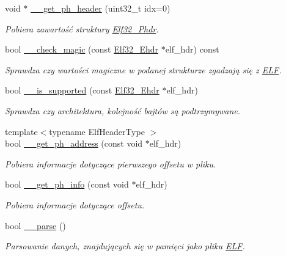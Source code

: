 \begin{DoxyCompactItemize}
void $\ast$ \hyperlink{class_e_l_f_a4be37d68119acd34b16dddf97fc6bbaa}{\-\_\-\-\_\-get\-\_\-ph\-\_\-header} (uint32\-\_\-t idx=0)
\begin{DoxyCompactList}\small\item\em Pobiera zawartość struktury \hyperlink{struct_elf32___phdr}{Elf32\-\_\-\-Phdr}. \end{DoxyCompactList}\item 
bool \hyperlink{class_e_l_f_a6b7f0e590a18eb59fb67fa2e3e2d2d38}{\-\_\-\-\_\-check\-\_\-magic} (const \hyperlink{struct_elf32___ehdr}{Elf32\-\_\-\-Ehdr} $\ast$elf\-\_\-hdr) const 
\begin{DoxyCompactList}\small\item\em Sprawdza czy wartości magiczne w podanej strukturze zgadzają się z \hyperlink{class_e_l_f}{E\-L\-F}. \end{DoxyCompactList}\item 
bool \hyperlink{class_e_l_f_ad0431b4ae3e583389ce50770a91e0fe4}{\-\_\-\-\_\-is\-\_\-supported} (const \hyperlink{struct_elf32___ehdr}{Elf32\-\_\-\-Ehdr} $\ast$elf\-\_\-hdr)
\begin{DoxyCompactList}\small\item\em Sprawdza czy architektura, kolejność bajtów są podtrzymywane. \end{DoxyCompactList}\item 
{\footnotesize template$<$typename Elf\-Header\-Type $>$ }\\bool \hyperlink{class_e_l_f_ae6d7b0491d7ba7be9a472d8e0d18d11e}{\-\_\-\-\_\-get\-\_\-ph\-\_\-address} (const void $\ast$elf\-\_\-hdr)
\begin{DoxyCompactList}\small\item\em Pobiera informacje dotyczące pierwszego offsetu w pliku. \end{DoxyCompactList}\item 
bool \hyperlink{class_e_l_f_a87c1d41bc1b48048895805df2327028c}{\-\_\-\-\_\-get\-\_\-ph\-\_\-info} (const void $\ast$elf\-\_\-hdr)
\begin{DoxyCompactList}\small\item\em Pobiera informacje dotyczące offsetu. \end{DoxyCompactList}\item 
bool \hyperlink{class_e_l_f_aec9424fae0011a27d586829d595b96ed}{\-\_\-\-\_\-parse} ()
\begin{DoxyCompactList}\small\item\em Parsowanie danych, znajdujących się w pamięci jako pliku \hyperlink{class_e_l_f}{E\-L\-F}. \end{DoxyCompactList}\item 

\end{DoxyCompactItemize}

